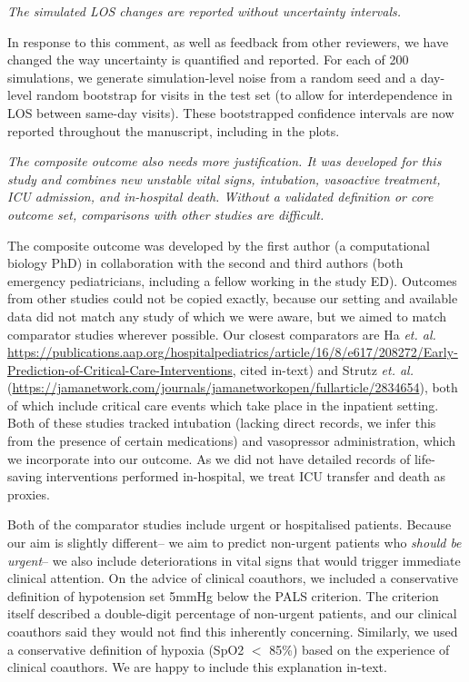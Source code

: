 \textit{     The simulated LOS changes are reported without uncertainty intervals.}

In response to this comment, as well as feedback from other reviewers, we have changed the way uncertainty is quantified and reported. For each of 200 simulations, we generate simulation-level noise from a random seed and a day-level random bootstrap for visits in the test set (to allow for interdependence in LOS between same-day visits). These bootstrapped confidence intervals are now reported throughout the manuscript, including in the plots.

\textit{    
     The composite outcome also needs more justification. It was developed for this study and combines new unstable vital signs, intubation, vasoactive treatment, ICU admission, and in-hospital death. Without a validated definition or core outcome set, comparisons with other studies are difficult.}

The composite outcome was developed by the first author (a computational biology PhD) in collaboration with the second and third authors (both emergency pediatricians, including a fellow working in the study ED). Outcomes from other studies could not be copied exactly, because our setting and available data did not match any study of which we were aware, but we aimed to match comparator studies wherever possible. Our closest comparators are Ha \textit{et. al.} \url{https://publications.aap.org/hospitalpediatrics/article/16/8/e617/208272/Early-Prediction-of-Critical-Care-Interventions}, cited in-text) and Strutz \textit{et. al.} (\url{https://jamanetwork.com/journals/jamanetworkopen/fullarticle/2834654}), both of which include critical care events which take place in the inpatient setting. Both of these studies tracked intubation (lacking direct records, we infer this from the presence of certain medications) and vasopressor administration, which we incorporate into our outcome. As we did not have detailed records of life-saving interventions performed in-hospital, we treat ICU transfer and death as proxies.

Both of the comparator studies include urgent or hospitalised patients. Because our aim is slightly different-- we aim to predict non-urgent patients who \textit{should be urgent}-- we also include deteriorations in vital signs that would trigger immediate clinical attention. On the advice of clinical coauthors, we included a conservative definition of hypotension set 5mmHg below the PALS criterion. The criterion itself described a double-digit percentage of non-urgent patients, and our clinical coauthors said they would not find this inherently concerning. Similarly, we used a conservative definition of hypoxia (SpO2 \(<\) 85\%) based on the experience of clinical coauthors. We are happy to include this explanation in-text.
    

